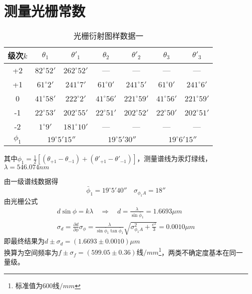 \documentclass[12pt, a4paper]{ctexart}
\begin{document}
\section{测量光栅常数}

\begin{table}[htbp]
  \centering
  \caption{光栅衍射图样数据一}
    \begin{tabular}{ccccccc}
    \toprule
    级次$k$   & $\theta_1$ & $\theta'_1$ & $\theta_2$ & $\theta'_2$ & $\theta_3$ & $\theta'_3$ \\
    \midrule
    +2    & $82^{\circ}52'$ & $262^{\circ}52'$ & —     & —     & —     & — \\
    +1    & $61^{\circ}2'$  & $241^{\circ}7'$  & $61^{\circ}0'$  & $241^{\circ}5'$  & $61^{\circ}0'$  & $241^{\circ}6'$  \\
    0     & $41^{\circ}58'$ & $222^{\circ}2'$  & $41^{\circ}56'$ & $221^{\circ}59'$ & $41^{\circ}56'$ & $221^{\circ}59'$ \\
    -1    & $22^{\circ}53'$ & $202^{\circ}55'$ & $22^{\circ}51'$ & $202^{\circ}52'$ & $22^{\circ}50'$ & $202^{\circ}51'$ \\
    -2    & $1^{\circ}9'$   & $181^{\circ}10'$ & —     & —     & —     & — \\
    \midrule
    $\phi_1$ & \multicolumn{2}{c}{$19^{\circ}5'15''$} & \multicolumn{2}{c}{$19^{\circ}5'30''$} & \multicolumn{2}{c}{$19^{\circ}6'15''$} \\
    \bottomrule
    \end{tabular}
  \label{tab:t5}
\end{table}
其中$\phi_1 = \frac{1}{2} [(\theta_{+1} - \theta_{-1}) + (\theta'_{+1} - \theta'_{-1})]$，测量谱线为汞灯绿线，$\lambda = 546.074nm$

由一级谱线数据得
\[ \bar{\phi}_1 = 19^{\circ}5'40'' \quad \sigma_{\phi_1 A} = 18'' \]
由光栅公式
\begin{gather*}
  d \sin \phi = k \lambda \quad \Rightarrow \quad d = \frac{\lambda}{\sin \bar{\phi}_1} = 1.6693 \mu m\\
  \sigma_d = \frac{\partial d}{\partial \phi} \sigma_{\phi} = \frac{\lambda}{\sin \bar{\phi}_1 \tan \bar{\phi}_1} \sqrt{\sigma_{\phi_1 A}^2 + \frac{e^2}{3}} = 0.0010 \mu m
\end{gather*}
即最终结果为$d \pm \sigma_d = (1.6693 \pm 0.0010) \mu m$\\
换算为空间频率为$f \pm \sigma_f = (599.05 \pm 0.36) \text{线}/mm$\footnote{标准值为$600\text{线}/mm$}，两类不确定度基本在同一量级。\\
\end{document}
